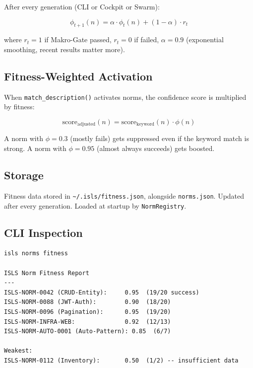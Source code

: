 \documentclass[11pt,a4paper]{article}
\begin{document}
After every generation (CLI or Cockpit or Swarm):

\begin{equation}
\phi_{t+1}(n) = \alpha \cdot \phi_t(n) + (1 - \alpha) \cdot r_t
\label{eq:fitness}
\end{equation}

where $r_t = 1$ if Makro-Gate passed, $r_t = 0$ if failed, 
$\alpha = 0.9$ (exponential smoothing, recent results matter 
more).

\subsection{Fitness-Weighted Activation}

When \texttt{match\_description()} activates norms, the 
confidence score is multiplied by fitness:

\begin{equation}
\text{score}_\text{adjusted}(n) = \text{score}_\text{keyword}(n) \cdot \phi(n)
\end{equation}

A norm with $\phi = 0.3$ (mostly fails) gets suppressed even 
if the keyword match is strong. A norm with $\phi = 0.95$ 
(almost always succeeds) gets boosted.

\subsection{Storage}

Fitness data stored in \texttt{\textasciitilde/.isls/fitness.json}, 
alongside \texttt{norms.json}. Updated after every generation. 
Loaded at startup by \texttt{NormRegistry}.

\subsection{CLI Inspection}

\begin{lstlisting}[style=bash]
isls norms fitness

ISLS Norm Fitness Report
---
ISLS-NORM-0042 (CRUD-Entity):     0.95  (19/20 success)
ISLS-NORM-0088 (JWT-Auth):        0.90  (18/20)
ISLS-NORM-0096 (Pagination):      0.95  (19/20)
ISLS-NORM-INFRA-WEB:              0.92  (12/13)
ISLS-NORM-AUTO-0001 (Auto-Pattern): 0.85  (6/7)

Weakest:
ISLS-NORM-0112 (Inventory):       0.50  (1/2) -- insufficient data
\end{lstlisting}
\end{document}
